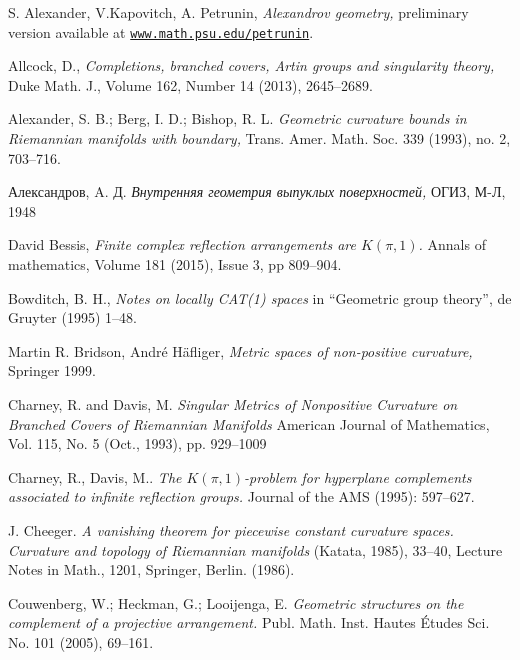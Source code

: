 \documentclass[oneside,a4paper]{article}
\begin{document}
\begin{thebibliography}{52}

 S. Alexander, V.Kapovitch, A. Petrunin, 
\textit{Alexandrov geometry,}
preliminary version available at \href{http://www.math.psu.edu/petrunin/}{\tt www.math.psu.edu/petrunin}.

 Allcock, D.,
\textit{Completions, branched covers, Artin groups and singularity theory,}
Duke Math. J., Volume 162, Number 14 (2013), 2645--2689. 

Alexander, S. B.; Berg, I. D.; Bishop, R. L. 
\textit{Geometric curvature bounds in Riemannian manifolds with boundary,} 
Trans. Amer. Math. Soc. 339 (1993), no. 2, 703--716.


\begin{otherlanguage}{russian}
Александров, A. Д.
\textit{Внутренняя геометрия выпуклых поверхностей,} ОГИЗ, М-Л, 1948
    \end{otherlanguage}

 David Bessis, 
\textit{Finite complex reflection arrangements are $K(\pi,1)$.}
Annals of mathematics,  Volume 181 (2015), Issue 3, pp 809--904.

 Bowditch, B. H.,
\textit{Notes on locally CAT(1) spaces}
in ``Geometric group theory'',  de Gruyter (1995) 1--48.

 Martin R. Bridson, Andr\'e H\"afliger, 
\textit{Metric spaces of non-positive curvature,} Springer 1999.

Charney, R. and  Davis, M.
\textit{Singular Metrics of Nonpositive Curvature on Branched Covers of Riemannian Manifolds}
American Journal of Mathematics, Vol. 115, No. 5 (Oct., 1993), pp. 929--1009

Charney, R., Davis, M.. 
\textit{The $K(\pi,1)$-problem for hyperplane complements associated to infinite reflection groups.} 
Journal of the AMS (1995): 597--627.

J. Cheeger. 
\textit{A vanishing theorem for piecewise constant curvature spaces. Curvature and topology of Riemannian manifolds}
(Katata, 1985), 33--40, 
Lecture Notes in Math.,
1201, Springer, Berlin. (1986).

 Couwenberg, W.; Heckman, G.; Looijenga, E.
\textit{Geometric structures on the complement of a projective arrangement.}
Publ. Math. Inst. Hautes \'Etudes Sci. No. 101 (2005), 69--161.


\end{thebibliography}
\end{document}
